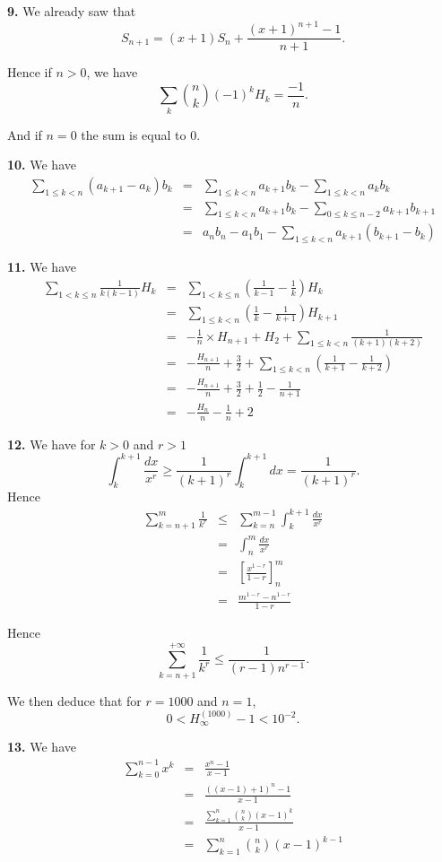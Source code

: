 \documentclass[a4paper,12pt]{article}
\newcommand{\newpar}[1]{\bigskip \noindent \textbf{#1.}}
\begin{document}
\newpar{9}  We already saw that
\[ S_{n+1} = (x+1) S_n + \frac{(x+1)^{n+1}-1}{n+1}.\]

Hence if $n > 0$, we have
\[ \sum_k {n \choose k}(-1)^k H_k = \frac{-1}{n}.\]

And if $n = 0$ the sum is equal to $0$.

\newpar{10} We have
\begin{eqnarray*}
  \sum_{1 \le k < n}(a_{k+1} - a_k)b_k &=& \sum_{1 \le k <
    n}a_{k+1}b_k - \sum_{1\le k < n}a_k b_k \\
  &=& \sum_{1\le k < n}a_{k+1}b_k - \sum_{0 \le k \le
    n-2}a_{k+1}b_{k+1} \\
  &=& a_nb_n - a_1b_1 - \sum_{1\le k < n}a_{k+1}(b_{k+1} - b_k)
\end{eqnarray*}

\newpar{11} We have
\begin{eqnarray*}
  \sum_{1 < k \le n} \frac{1}{k(k-1)} H_k &=& \sum_{1 < k \le n}
  \left(\frac{1}{k-1} - \frac{1}{k} \right) H_k \\
  &=& \sum_{1\le k < n} \left(\frac{1}{k} - \frac{1}{k+1}\right)
  H_{k+1} \\
  &=& -\frac{1}{n} \times H_{n+1} + H_2 + \sum_{1\le k < n}
  \frac{1}{(k+1)(k+2)} \\
  &=& -\frac{H_{n+1}}{n} + \frac{3}{2} + \sum_{1\le k <
    n}\left(\frac{1}{k+1} - \frac{1}{k+2}\right) \\
  &=& -\frac{H_{n+1}}{n} + \frac{3}{2} + \frac{1}{2} - \frac{1}{n+1} \\
  &=& -\frac{H_n}{n} -\frac{1}{n} + 2
\end{eqnarray*}

\newpar{12} We have for $k > 0$ and $r > 1$
\[ \int_k^{k+1}\frac{dx}{x^r} \ge \frac{1}{(k+1)^r} \int_k^{k+1}dx =
\frac{1}{(k+1)^r}.\]
Hence
\begin{eqnarray*}
  \sum_{k=n+1}^m \frac{1}{k^r} &\le& \sum_{k=n}^{m-1} \int_k^{k+1}
  \frac{dx}{x^r} \\
  &=& \int_{n}^m \frac{dx}{x^r} \\
  &=& \left[ \frac{x^{1-r}}{1-r}\right]_n^m \\
  &=& \frac{m^{1-r} - n^{1-r}}{1-r}
\end{eqnarray*}

Hence
\[ \sum_{k=n+1}^{+\infty} \frac{1}{k^r} \le
\frac{1}{(r-1)n^{r-1}}.\]

We then deduce that for $r = 1000$ and $n = 1$,
\[ 0 < H_\infty^{(1000)} - 1 < 10^{-2}.\]

\newpar{13} We have
\begin{eqnarray*}
  \sum_{k=0}^{n-1} x^k &=& \frac{x^n - 1}{x-1} \\
  &=& \frac{((x-1) + 1)^n - 1}{x-1} \\
  &=& \frac{\sum_{k=1}^n {n \choose k}(x-1)^k}{x-1} \\
  &=& \sum_{k=1}^n {n \choose k}(x-1)^{k-1}
\end{eqnarray*}
\end{document}
